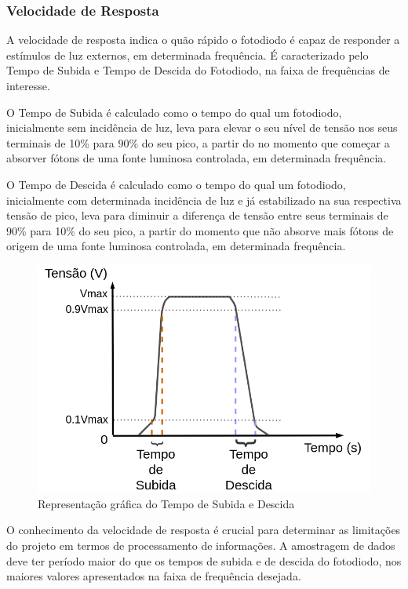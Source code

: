 \subsubsection{Velocidade de Resposta}
A velocidade de resposta indica o quão rápido o fotodiodo \'e capaz de responder a estímulos de luz externos, em determinada frequência. É caracterizado pelo Tempo de Subida e Tempo de Descida do Fotodiodo, na faixa de frequências de interesse.

O Tempo de Subida \'e calculado como o tempo do qual um fotodiodo, inicialmente sem incidência de luz, leva para elevar o seu nível de tensão nos seus terminais de 10\% para 90\% do seu pico, a partir do no momento que começar a absorver fótons de uma fonte luminosa controlada, em determinada frequência.

O Tempo de Descida \'e calculado como o tempo do qual um fotodiodo, inicialmente com determinada incidência de luz e já estabilizado na sua respectiva tensão de pico, leva para diminuir a diferença de tensão entre seus terminais de 90\% para 10\% do seu pico, a partir do momento que não absorve mais fótons de origem de uma fonte luminosa controlada, em determinada frequência.

\begin{figure}[!h]
	\caption{\label{fig_velocidadeResp}Representação gr\'afica do Tempo de Subida e Descida}
	\begin{center}
	    \includegraphics[scale=0.3]{Imagens/GraficoVelocidadeResposta.png}
	\end{center}
\end{figure}

O conhecimento da velocidade de resposta \'e crucial para determinar as limitações do projeto em termos de processamento de informações. A amostragem de dados deve ter período maior do que os tempos de subida e de descida do fotodiodo, nos maiores valores apresentados na faixa de frequência desejada.

